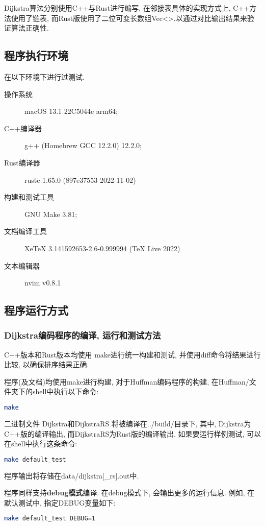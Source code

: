 Dijkstra算法分别使用C++与Rust进行编写, 在邻接表具体的实现方式上,
C++方法使用了链表,
而Rust版使用了二位可变长数组Vec<>.以通过对比输出结果来验证算法正确性.

\subsection{程序执行环境}
在以下环境下进行过测试.

\begin{description}
	\item[操作系统] macOS 13.1 22C5044e arm64;
	\item[C++编译器] g++ (Homebrew GCC 12.2.0) 12.2.0;
	\item[Rust编译器] rustc 1.65.0 (897e37553 2022-11-02)
	\item[构建和测试工具] GNU Make 3.81;
	\item[文档编译工具] XeTeX 3.141592653-2.6-0.999994 (TeX Live 2022)
	\item[文本编辑器] nvim v0.8.1
\end{description}

\subsection{程序运行方式}
\subsubsection{Dijkstra编码程序的编译, 运行和测试方法}
C++版本和Rust版本均使用 make进行统一构建和测试, 并使用diff命令将结果进行比较,
以确保排序结果正确.\par

程序(及文档)均使用make进行构建, 对于Huffman编码程序的构建, 在Huffman/文件夹下的shell中执行以下命令:
\begin{lstlisting}[language=bash]
make
\end{lstlisting}
二进制文件 Dijkstra和DijkstraRS 将被编译在../build/目录下, 其中,
Dijkstra为C++版的编译输出, 而DijkstraRS为Rust版的编译输出.
如果要运行样例测试, 可以在shell中执行这条命令:

\begin{lstlisting}[language=bash]
make default_test
\end{lstlisting}
程序输出将存储在data/dijkstra[\_rs].out中.\par

程序同样支持\textbf{debug模式}编译. 在debug模式下, 会输出更多的运行信息.
例如, 在默认测试中, 指定DEBUG变量如下:
\begin{lstlisting}[language=bash]
make default_test DEBUG=1
\end{lstlisting}

